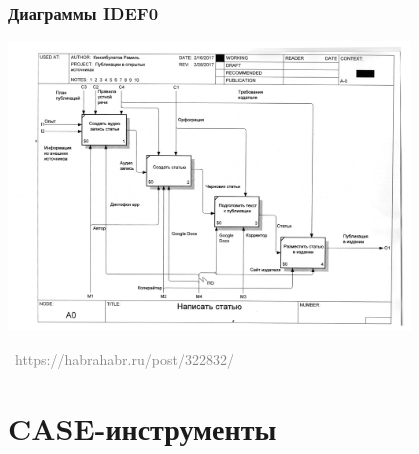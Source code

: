 \documentclass[xetex,mathserif,serif]{beamer}
\newcommand{\attribution}[1] {
    \vspace{-5mm}\begin{flushright}\begin{scriptsize}\textcolor{gray}{\textcopyright\, #1}\end{scriptsize}\end{flushright}
}
\begin{document}
    \begin{frame}
        \frametitle{Диаграммы IDEF0}
        \begin{center}
            \includegraphics[width=0.80\textwidth]{idef0.png}
            \attribution{https://habrahabr.ru/post/322832/}
        \end{center}
    \end{frame}

    \section{CASE-инструменты}
\end{document}
